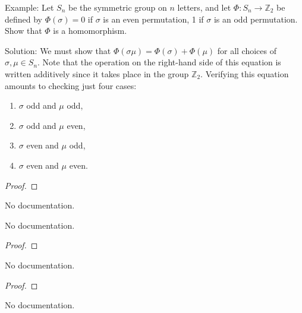 \begin{theorem}[Exercise 19]\label{Ex19}
    Example: Let $S_n$ be the symmetric group on $n$ letters, and let $\Phi : S_n \to \mathbb{Z}_2$ be defined by $\Phi(\sigma) = 0$ if $\sigma$ is an even permutation, 1 if $\sigma$ is an odd permutation. Show that $\Phi$ is a homomorphism.

    Solution: We must show that $\Phi(\sigma\mu) = \Phi(\sigma) + \Phi(\mu)$ for all choices of $\sigma, \mu \in S_n$. Note that the operation on the right-hand side of this equation is written additively since it takes place in the group $\mathbb{Z}_2$. Verifying this equation amounts to checking just four cases:
    \begin{enumerate}
        \item $\sigma$ odd and $\mu$ odd,
        \item $\sigma$ odd and $\mu$ even,
        \item $\sigma$ even and $\mu$ odd,
        \item $\sigma$ even and $\mu$ even.
    \end{enumerate}
\end{theorem}
\begin{proof}

\end{proof}



\begin{definition}\label{H}
        \leanok
                No documentation.
    \end{definition}

\begin{theorem}\label{Ex1
--}
        \leanok
                No documentation.
    \end{theorem}

\begin{proof}
    \leanok
\end{proof}

\begin{theorem}\label{Ex2
--}
        \leanok
                No documentation.
    \end{theorem}

\begin{proof}
    \leanok
\end{proof}

\begin{theorem}\label{Ex3}
        \leanok
                No documentation.
    \end{theorem}

